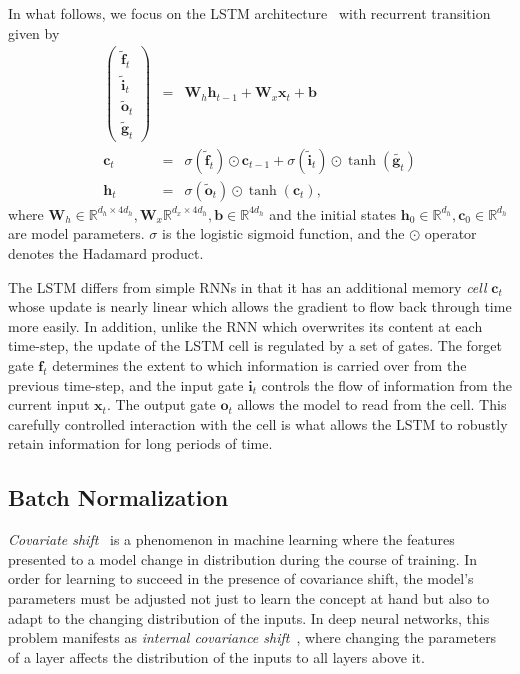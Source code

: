 \documentclass{article} %
\newcommand{\vect}[1]{\mathbf{#1}}
\newcommand{\mat}[1]{\mathbf{#1}}
\newcommand{\ewprod}{\odot}
\newcommand{\reals}{\mathbb{R}}
\begin{document}
In what follows, we focus on the LSTM architecture~\cite{lstm} with recurrent transition given by
\begin{eqnarray}
\left(\begin{array}{ccc}
\tilde{\vect{f}}_t \\
\tilde{\vect{i}}_t \\
\tilde{\vect{o}}_t \\
\tilde{\vect{g}}_t
\end{array}\right)
 &=&
 \mat{W}_h \vect{h}_{t-1} +
 \mat{W}_x \vect{x}_t +
 \vect{b}
 \\
\vect{c}_t &= &\sigma(\tilde{\vect{f}}_t) \ewprod \vect{c}_{t-1} +
\sigma(\tilde{\vect{i}}_t) \ewprod \tanh(\tilde{\vect{g}_t}) \\
\vect{h}_t &= &\sigma(\tilde{\vect{o}}_t) \ewprod \tanh(\vect{c}_t),
\end{eqnarray}
where $\vect{W}_h \in \reals^{d_h \times 4 d_h}, \vect{W}_x \reals^{d_x \times 4 d_h}, \vect{b} \in \reals^{4 d_h}$
and the initial states $\vect{h}_0 \in \reals^{d_h}, \vect{c}_0 \in \reals^{d_h}$ %
are model parameters.
$\sigma$ is the logistic sigmoid function, and the $\ewprod$ operator denotes the Hadamard product.

The LSTM differs from simple RNNs in that it has an additional memory \emph{cell} $\vect{c}_t$ whose update is nearly linear which allows the gradient to flow back through time more easily.
In addition, unlike the RNN which overwrites its content at each time-step,
the update of the LSTM cell is regulated by a set of gates.
The forget gate $\vect{f}_t$ determines the extent to which information is carried over from the previous time-step,
and the input gate $\vect{i}_t$ controls the flow of information from the current input $\vect{x}_t$.
The output gate $\vect{o}_t$ allows the model to read from the cell.
This carefully controlled interaction with the cell is what allows the LSTM to robustly retain information for long periods of time.

\subsection{Batch Normalization}

\emph{Covariate shift}~\cite{shimodaira2000improving} is a phenomenon in machine learning where
the features presented to a model change in distribution during the course of training.
In order for learning to succeed in the presence of covariance shift,
the model's parameters must be adjusted not just to learn the concept at hand
but also to adapt to the changing distribution of the inputs.
In deep neural networks, this problem manifests as \emph{internal covariance shift}~\cite{batchnorm},
where changing the parameters of a layer affects the distribution of the inputs to all layers above it.
\end{document}
